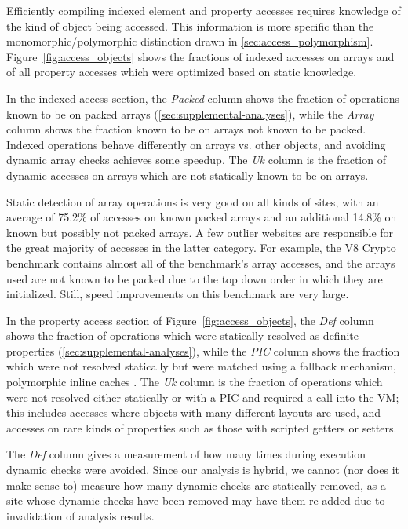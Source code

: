 Efficiently compiling indexed element and property accesses requires
knowledge of the kind of object being accessed.
This information is more specific than the monomorphic/polymorphic
distinction drawn in \Section\ref{sec:access_polymorphism}.
Figure~\ref{fig:access_objects} shows the fractions of indexed accesses on arrays
and of all property accesses which were optimized based on static knowledge.

In the indexed access section, the {\it Packed} column shows the fraction
of operations known to be on packed arrays (\Section\ref{sec:supplemental-analyses}),
while the {\it Array} column shows the fraction known to be on arrays not
known to be packed.
Indexed operations behave differently on arrays vs. other objects,
and avoiding dynamic array checks achieves some speedup.
The {\it Uk} column is the fraction of dynamic accesses on arrays which
are not statically known to be on arrays.

Static detection of array operations is very good on all kinds of sites,
with an average of 75.2\% of accesses on known packed arrays and
an additional 14.8\% on known but possibly not packed arrays.
A few outlier websites are responsible for the great majority of
accesses in the latter category.
For example, the V8 Crypto benchmark contains almost all of the benchmark's
array accesses, and the arrays used are not known to be packed
due to the top down order in which they are initialized.
Still, speed improvements on this benchmark are very large.

In the property access section of Figure~\ref{fig:access_objects},
the {\it Def} column shows the fraction
of operations which were statically resolved as definite properties
(\Section\ref{sec:supplemental-analyses}), while the {\it PIC} column shows the fraction which
were not resolved statically but were matched using a fallback mechanism,
polymorphic inline caches \cite{Holzle91}.
The {\it Uk} column is the fraction of operations which were not resolved
either statically or with a PIC and required a call into the VM;
this includes accesses where objects
with many different layouts are used, and accesses on rare kinds of
properties such as those with scripted getters or setters.

The {\it Def} column gives a measurement of how many times during execution dynamic checks were avoided. Since our analysis is hybrid, we cannot (nor does it make sense to) measure how many dynamic checks are statically removed, as a site whose dynamic checks have been removed may have them re-added due to invalidation of analysis results.

